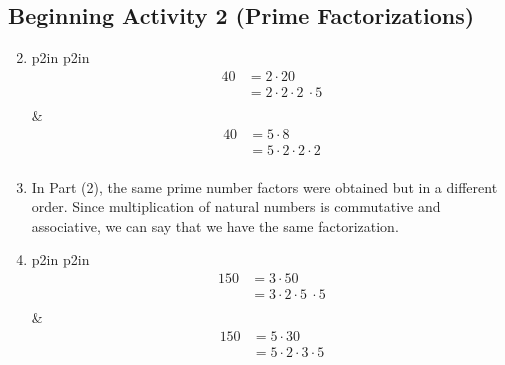 \documentclass[11pt]{article}
\begin{document}
\subsection*{Beginning Activity 2 (Prime Factorizations)}
\begin{enumerate} \setcounter{enumi}{1}
\item
\begin{tabular}[t]{p{2in} p{2in}}
\[
\begin{aligned}
40 &= 2 \cdot 20 \\ 
   &= 2 \cdot 2 \cdot 2 \ \cdot 5 \\
\end{aligned}
\]
&  
\[
\begin{aligned}
40 &= 5 \cdot 8 \\
   &= 5 \cdot 2 \cdot 2 \cdot 2 \\
\end{aligned}
\]
\end{tabular} 

\item In Part (2), the same prime number factors were obtained but in a different order.  Since multiplication of natural numbers is commutative and associative, we can say that we have the same factorization.

\item
\begin{tabular}[t]{p{2in} p{2in}}
\[
\begin{aligned}
150 &= 3 \cdot 50 \\ 
   &= 3 \cdot 2 \cdot 5 \ \cdot 5 \\
\end{aligned}
\]
&  
\[
\begin{aligned}
150 &= 5 \cdot 30 \\
   &= 5 \cdot 2 \cdot 3 \cdot 5 \\
\end{aligned}
\]
\end{tabular} 
\end{enumerate}
\hbreak
\end{document}
